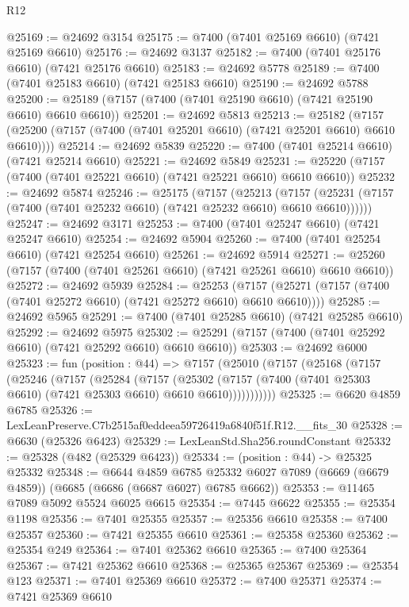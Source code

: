 \begin{lexlean}{R12}
\begin{coremodule}
@25169 := @24692 @3154
@25175 := @7400 (@7401 @25169 @6610) (@7421 @25169 @6610)
@25176 := @24692 @3137
@25182 := @7400 (@7401 @25176 @6610) (@7421 @25176 @6610)
@25183 := @24692 @5778
@25189 := @7400 (@7401 @25183 @6610) (@7421 @25183 @6610)
@25190 := @24692 @5788
@25200 := @25189 (@7157 (@7400 (@7401 @25190 @6610) (@7421 @25190 @6610) @6610 @6610))
@25201 := @24692 @5813
@25213 := @25182
    (@7157 (@25200 (@7157 (@7400 (@7401 @25201 @6610) (@7421 @25201 @6610) @6610 @6610))))
@25214 := @24692 @5839
@25220 := @7400 (@7401 @25214 @6610) (@7421 @25214 @6610)
@25221 := @24692 @5849
@25231 := @25220 (@7157 (@7400 (@7401 @25221 @6610) (@7421 @25221 @6610) @6610 @6610))
@25232 := @24692 @5874
@25246 := @25175
    (@7157
      (@25213
        (@7157 (@25231 (@7157 (@7400 (@7401 @25232 @6610) (@7421 @25232 @6610) @6610 @6610))))))
@25247 := @24692 @3171
@25253 := @7400 (@7401 @25247 @6610) (@7421 @25247 @6610)
@25254 := @24692 @5904
@25260 := @7400 (@7401 @25254 @6610) (@7421 @25254 @6610)
@25261 := @24692 @5914
@25271 := @25260 (@7157 (@7400 (@7401 @25261 @6610) (@7421 @25261 @6610) @6610 @6610))
@25272 := @24692 @5939
@25284 := @25253
    (@7157 (@25271 (@7157 (@7400 (@7401 @25272 @6610) (@7421 @25272 @6610) @6610 @6610))))
@25285 := @24692 @5965
@25291 := @7400 (@7401 @25285 @6610) (@7421 @25285 @6610)
@25292 := @24692 @5975
@25302 := @25291 (@7157 (@7400 (@7401 @25292 @6610) (@7421 @25292 @6610) @6610 @6610))
@25303 := @24692 @6000
@25323 := fun (position : @44) =>
  @7157
    (@25010
      (@7157
        (@25168
          (@7157
            (@25246
              (@7157
                (@25284
                  (@7157
                    (@25302
                      (@7157 (@7400 (@7401 @25303 @6610) (@7421 @25303 @6610) @6610 @6610)))))))))))
@25325 := @6620 @4859 @6785
@25326 := LexLeanPreserve.C7b2515af0eddeea59726419a6840f51f.R12.__fits_30
@25328 := @6630 (@25326 @6423)
@25329 := LexLeanStd.Sha256.roundConstant
@25332 := @25328 (@482 (@25329 @6423))
@25334 := (position : @44) -> @25325 @25332
@25348 := @6644
    @4859
    @6785
    @25332
    @6027
    @7089
    (@6669 (@6679 @4859))
    (@6685 (@6686 (@6687 @6027) @6785 @6662))
@25353 := @11465 @7089 @5092 @5524 @6025 @6615
@25354 := @7445 @6622
@25355 := @25354 @1198
@25356 := @7401 @25355
@25357 := @25356 @6610
@25358 := @7400 @25357
@25360 := @7421 @25355 @6610
@25361 := @25358 @25360
@25362 := @25354 @249
@25364 := @7401 @25362 @6610
@25365 := @7400 @25364
@25367 := @7421 @25362 @6610
@25368 := @25365 @25367
@25369 := @25354 @123
@25371 := @7401 @25369 @6610
@25372 := @7400 @25371
@25374 := @7421 @25369 @6610

\end{coremodule}
\end{lexlean}
